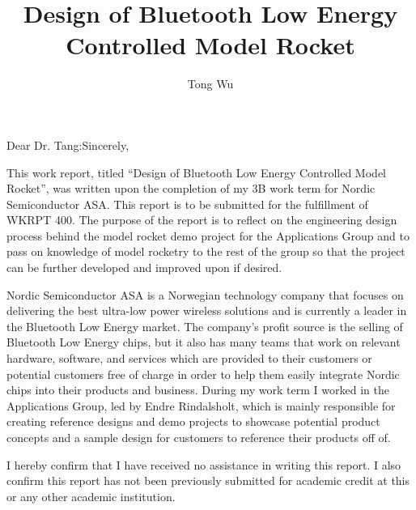 \documentclass{workreport}
\title{
	Design of Bluetooth Low Energy Controlled Model Rocket
}
\author{Tong Wu}
\begin{document}

\begin{frontmatter}

\begin{letter_of_submittal}{Dear Dr. Tang:}{Sincerely,}

	This work report, titled “Design of Bluetooth Low Energy Controlled Model Rocket”, was written upon the completion of my 3B work term for Nordic Semiconductor ASA. This report is to be submitted for the fulfillment of WKRPT 400. The purpose of the report is to reflect on the engineering design process behind the model rocket demo project for the Applications Group and to pass on knowledge of model rocketry to the rest of the group so that the project can be further developed and improved upon if desired.

	Nordic Semiconductor ASA is a Norwegian technology company that focuses on delivering the best ultra-low power wireless solutions and is currently a leader in the Bluetooth Low Energy market. The company's profit source is the selling of Bluetooth Low Energy chips, but it also has many teams that work on relevant hardware, software, and services which are provided to their customers or potential customers free of charge in order to help them easily integrate Nordic chips into their products and business. During my work term I worked in the Applications Group, led by Endre Rindalsholt, which is mainly responsible for creating reference designs and demo projects to showcase potential product concepts and a sample design for customers to reference their products off of.

	I hereby confirm that I have received no assistance in writing this report. I also confirm this report has not been previously submitted for academic credit at this or any other academic institution.


\end{letter_of_submittal}

\begin{contributions}


\end{contributions}
\end{frontmatter}
\end{document}
